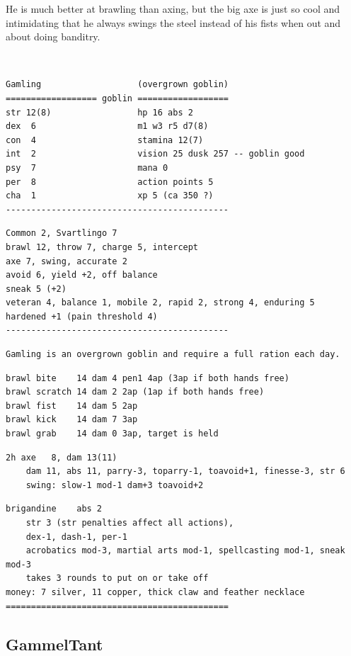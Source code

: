 He is much better at brawling than axing, but the big axe is just so cool and intimidating that he always swings the steel instead of his fists when out and about doing banditry.

\

\small \begin{samepage} \begin{verbatim}
Gamling                   (overgrown goblin)
================== goblin ==================
str 12(8)                 hp 16 abs 2
dex  6                    m1 w3 r5 d7(8)
con  4                    stamina 12(7)
int  2                    vision 25 dusk 257 -- goblin good
psy  7                    mana 0
per  8                    action points 5
cha  1                    xp 5 (ca 350 ?)
--------------------------------------------
\end{verbatim} \goodbreak \begin{verbatim}
Common 2, Svartlingo 7
brawl 12, throw 7, charge 5, intercept
axe 7, swing, accurate 2
avoid 6, yield +2, off balance
sneak 5 (+2)
veteran 4, balance 1, mobile 2, rapid 2, strong 4, enduring 5
hardened +1 (pain threshold 4)
--------------------------------------------
\end{verbatim} \goodbreak \begin{verbatim}
Gamling is an overgrown goblin and require a full ration each day.
\end{verbatim} \goodbreak \begin{verbatim}
brawl bite    14 dam 4 pen1 4ap (3ap if both hands free)
brawl scratch 14 dam 2 2ap (1ap if both hands free)
brawl fist    14 dam 5 2ap
brawl kick    14 dam 7 3ap
brawl grab    14 dam 0 3ap, target is held
\end{verbatim} \goodbreak \begin{verbatim}
2h axe   8, dam 13(11) 
    dam 11, abs 11, parry-3, toparry-1, toavoid+1, finesse-3, str 6
    swing: slow-1 mod-1 dam+3 toavoid+2
\end{verbatim} \goodbreak \begin{verbatim}
brigandine    abs 2
    str 3 (str penalties affect all actions),
    dex-1, dash-1, per-1
    acrobatics mod-3, martial arts mod-1, spellcasting mod-1, sneak mod-3
    takes 3 rounds to put on or take off
money: 7 silver, 11 copper, thick claw and feather necklace
============================================
\end{verbatim} \end{samepage} \normalsize


\subsection*{GammelTant}

